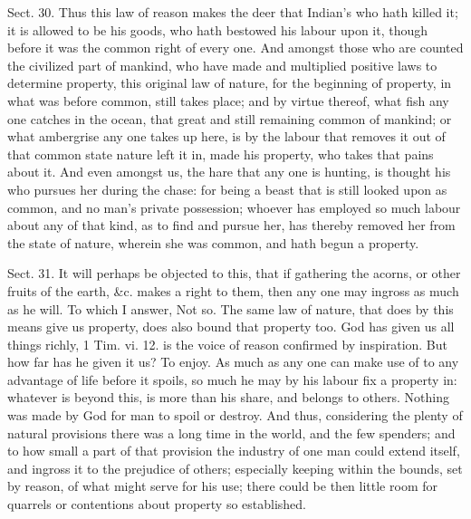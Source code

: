 \documentclass[11pt,openany]{book}
\begin{document}
Sect. 30. Thus this law of reason makes the deer that Indian's who hath killed it; it is allowed to be his goods, who hath bestowed his labour upon it, though before it was the common right of every one. And amongst those who are counted the civilized part of mankind, who have made and multiplied positive laws to determine property, this original law of nature, for the beginning of property, in what was before common, still takes place; and by virtue thereof, what fish any one catches in the ocean, that great and still remaining common of mankind; or what ambergrise any one takes up here, is by the labour that removes it out of that common state nature left it in, made his property, who takes that pains about it. And even amongst us, the hare that any one is hunting, is thought his who pursues her during the chase: for being a beast that is still looked upon as common, and no man's private possession; whoever has employed so much labour about any of that kind, as to find and pursue her, has thereby removed her from the state of nature, wherein she was common, and hath begun a property.

Sect. 31. It will perhaps be objected to this, that if gathering the acorns, or other fruits of the earth, \&c. makes a right to them, then any one may ingross as much as he will. To which I answer, Not so. The same law of nature, that does by this means give us property, does also bound that property too. God has given us all things richly, 1 Tim. vi. 12. is the voice of reason confirmed by inspiration. But how far has he given it us? To enjoy. As much as any one can make use of to any advantage of life before it spoils, so much he may by his labour fix a property in: whatever is beyond this, is more than his share, and belongs to others. Nothing was made by God for man to spoil or destroy. And thus, considering the plenty of natural provisions there was a long time in the world, and the few spenders; and to how small a part of that provision the industry of one man could extend itself, and ingross it to the prejudice of others; especially keeping within the bounds, set by reason, of what might serve for his use; there could be then little room for quarrels or contentions about property so established.
\end{document}
